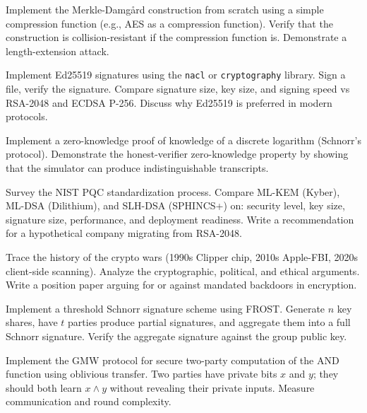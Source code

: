 \begin{exercise}[Computational]
Implement the Merkle-Damgård construction from scratch using a simple compression function (e.g., AES as a compression function). Verify that the construction is collision-resistant if the compression function is. Demonstrate a length-extension attack.
\end{exercise}

\begin{exercise}[Computational]
Implement Ed25519 signatures using the \texttt{nacl} or \texttt{cryptography} library. Sign a file, verify the signature. Compare signature size, key size, and signing speed vs RSA-2048 and ECDSA P-256. Discuss why Ed25519 is preferred in modern protocols.
\end{exercise}

\begin{exercise}[Computational]
Implement a zero-knowledge proof of knowledge of a discrete logarithm (Schnorr's protocol). Demonstrate the honest-verifier zero-knowledge property by showing that the simulator can produce indistinguishable transcripts.
\end{exercise}

\begin{exercise}[Research]
Survey the NIST PQC standardization process. Compare ML-KEM (Kyber), ML-DSA (Dilithium), and SLH-DSA (SPHINCS+) on: security level, key size, signature size, performance, and deployment readiness. Write a recommendation for a hypothetical company migrating from RSA-2048.
\end{exercise}

\begin{exercise}[Research]
Trace the history of the crypto wars (1990s Clipper chip, 2010s Apple-FBI, 2020s client-side scanning). Analyze the cryptographic, political, and ethical arguments. Write a position paper arguing for or against mandated backdoors in encryption.
\end{exercise}

\begin{exercise}[Challenge]
Implement a threshold Schnorr signature scheme using FROST. Generate $n$ key shares, have $t$ parties produce partial signatures, and aggregate them into a full Schnorr signature. Verify the aggregate signature against the group public key.
\end{exercise}

\begin{exercise}[Computational]
Implement the GMW protocol for secure two-party computation of the AND function using oblivious transfer. Two parties have private bits $x$ and $y$; they should both learn $x \land y$ without revealing their private inputs. Measure communication and round complexity.
\end{exercise}

